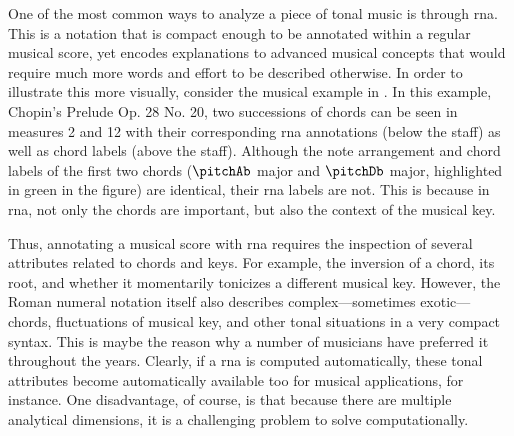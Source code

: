 
One of the most common ways to analyze a piece of tonal
music is through \gls{rna}. This is a notation that is
compact enough to be annotated within a regular musical
score, yet encodes explanations to advanced musical concepts
that would require much more words and effort to be
described otherwise. In order to illustrate this more
visually, consider the musical example in
. In this example, Chopin's
Prelude Op. 28 No. 20, two successions of chords can be seen
in measures 2 and 12 with their corresponding \gls{rna}
annotations (below the staff) as well as chord labels (above
the staff). Although the note arrangement and chord labels
of the first two chords ($\pitchAb$ major and $\pitchDb$
major, highlighted in green in the figure) are identical,
their \gls{rna} labels are not. This is because in
\gls{rna}, not only the chords are important, but also the
context of the musical key.


Thus, annotating a musical score with \gls{rna} requires the
inspection of several attributes related to chords and keys.
For example, the inversion of a chord, its root, and whether
it momentarily tonicizes a different musical key. However,
the Roman numeral notation itself also describes
complex---sometimes exotic---chords, fluctuations of musical
key, and other tonal situations in a very compact syntax.
This is maybe the reason why a number of musicians have
preferred it throughout the years. Clearly, if a \gls{rna}
is computed automatically, these tonal attributes become
automatically available too for musical applications, for
instance. One disadvantage, of course, is that because there
are multiple analytical dimensions, it is a challenging problem to solve computationally.



